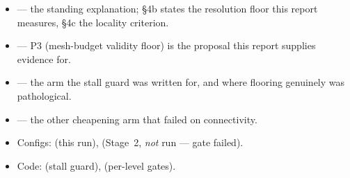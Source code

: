 \documentclass[11pt,a4paper]{article}
\begin{document}
\begin{itemize}
  \item {} --- the
    standing explanation; \S4b states the resolution floor this report measures,
    \S4c the locality criterion.
  \item {} --- P3
    (mesh-budget validity floor) is the proposal this report supplies evidence
    for.
  \item {} --- the arm the
    stall guard was written for, and where flooring genuinely was pathological.
  \item {} --- the
    other cheapening arm that failed on connectivity.
  \item Configs: 
    (this run), 
    (Stage~2, \emph{not} run --- gate failed).
  \item Code:  (stall guard),
     (per-level gates).
\end{itemize}
\end{document}
